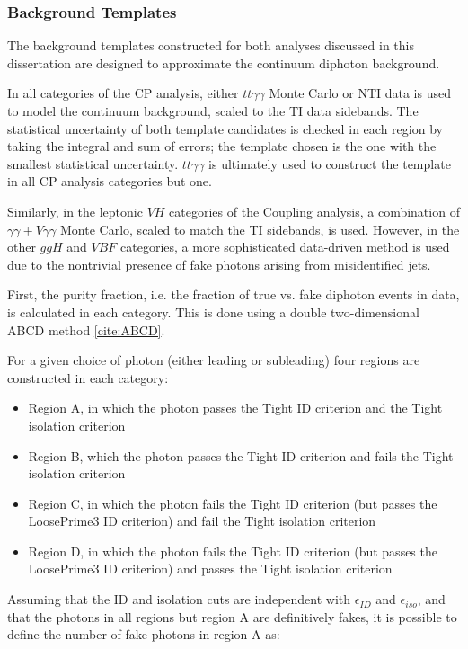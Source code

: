 \subsubsection{Background Templates} \label{sec:bkgtemplates} 

The background templates constructed for both analyses discussed in this dissertation are designed to approximate the continuum diphoton background. 

In all categories of the CP analysis, either $tt\gamma\gamma$ Monte Carlo or NTI data is used to model the continuum background, scaled to the TI data sidebands. The statistical uncertainty of both template candidates is checked in each region by taking the integral and sum of errors; the template chosen is the one with the smallest statistical uncertainty. $tt\gamma\gamma$ is ultimately used to construct the template in all CP analysis categories but one. 

Similarly, in the leptonic $VH$ categories of the Coupling analysis, a combination of $\gamma\gamma + V\gamma\gamma$ Monte Carlo, scaled to match the TI sidebands, is used. However, in the other $ggH$ and $VBF$ categories, a more sophisticated data-driven method is used due to the nontrivial presence of fake photons arising from misidentified jets. 

First, the purity fraction, i.e. the fraction of true vs. fake diphoton events in data, is calculated in each category. This is done using a double two-dimensional ABCD method \ref{cite:ABCD}.

For a given choice of photon (either leading or subleading) four regions are constructed in each category:

\begin{itemize}
\item Region A, in which the photon passes the Tight ID criterion and the Tight isolation criterion
\item Region B, which the photon passes the Tight ID criterion and fails the Tight isolation criterion
\item Region C, in which the photon fails the Tight ID criterion (but passes the LoosePrime3 ID criterion) and fail the Tight isolation criterion
\item Region D, in which the photon fails the Tight ID criterion (but passes the LoosePrime3 ID criterion) and passes the Tight isolation criterion
\end{itemize} 

Assuming that the ID and isolation cuts are independent with $\epsilon_{ID}$ and $\epsilon_{iso}$, and that the photons in all regions but region A are definitively fakes, it is possible to define the number of fake photons in region A as:

